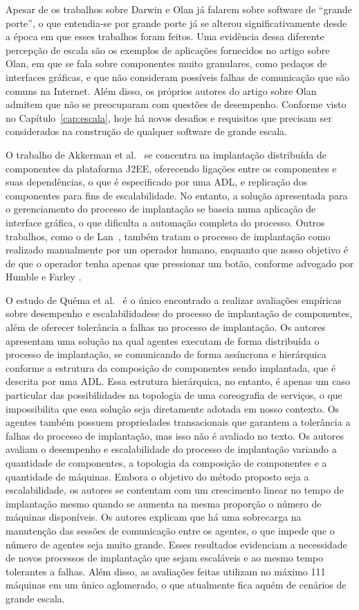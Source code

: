 Apesar de os trabalhos sobre Darwin e Olan já falarem sobre software de ``grande porte'', o que entendia-se por grande porte já se alterou significativamente desde a época em que esses trabalhos foram feitos. Uma evidência dessa diferente percepção de escala são os exemplos de aplicações fornecidos no artigo sobre Olan, em que se fala sobre componentes muito granulares, como pedaços de interfaces gráficas, e que não consideram possíveis falhas de comunicação que são comuns na Internet. Além disso, os próprios autores do artigo sobre Olan admitem que não se preocuparam com questões de desempenho. Conforme visto no Capítulo~\ref{cap:escala}, hoje há novos desafios e requisitos que precisam ser considerados na construção de qualquer software de grande escala.

O trabalho de Akkerman et al.~\cite{akkerman2005j2ee} se concentra na implantação distribuída de componentes da plataforma J2EE, oferecendo ligações entre os componentes e suas dependências, o que é especificado por uma ADL, e replicação dos componentes para fins de escalabilidade. No entanto, a solução apresentada para o gerenciamento do processo de implantação se baseia numa aplicação de interface gráfica, o que dificulta a automação completa do processo. Outros trabalhos, como o de Lan~\cite{lan2005architecture}, também tratam o processo de implantação como realizado manualmente por um operador humano, enquanto que nosso objetivo é de que o operador tenha apenas que pressionar um botão, conforme advogado por Humble e Farley \cite{Humble2011Continuous}.

O estudo de Quéma et al.~\cite{quema2004hierarchical} é o único encontrado a realizar avaliações empíricas sobre desempenho e escalabilidadese do processo de implantação de componentes, além de oferecer tolerância a falhas no processo de implantação. Os autores apresentam uma solução na qual agentes executam de forma distribuída o processo de implantação, se comunicando de forma assíncrona e hierárquica conforme a estrutura da composição de componentes sendo implantada, que é descrita por uma ADL. Essa estrutura hierárquica, no entanto, é apenas um caso particular das possibilidades na topologia de uma coreografia de serviços, o que impossibilita que essa solução seja diretamente adotada em nosso contexto. Os agentes também possuem propriedades transacionais que garantem a tolerância a falhas do processo de implantação, mas isso não é avaliado no texto. Os autores avaliam o desempenho e escalabilidade do processo de implantação variando a quantidade de componentes, a topologia da composição de componentes e a quantidade de máquinas. Embora o objetivo do método proposto seja a escalabilidade, os autores se contentam com um crescimento linear no tempo de implantação mesmo quando se aumenta na mesma proporção o número de máquinas disponíveis. Os autores explicam que há uma sobrecarga na manutenção das sessões de comunicação entre os agentes, o que impede que o número de agentes seja muito grande. Esses resultados evidenciam a necessidade de novos processos de implantação que sejam escaláveis e ao mesmo tempo tolerantes a falhas. Além disso, as avaliações feitas utilizam no máximo 111 máquinas em um único aglomerado, o que atualmente fica aquém de cenários de grande escala. 

